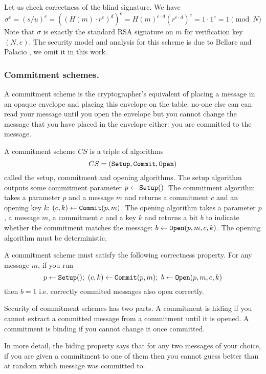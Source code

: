 \documentclass[envcountsame]{llncs}
\newcommand{\alg}[1]{\textup{\texttt{#1}}}
\begin{document}
Let us check correctness of the blind signature. We have
\[
\sigma^e = (s/u)^e = ((H(m) \cdot r^e)^d)^e = H(m)^{e \cdot d} (r^{e \cdot d})^e
= 1 \cdot 1^e = 1 \pmod{N}
\]
Note that $\sigma$ is exactly the standard RSA signature on $m$ for verification
key $(N, e)$. The security model and analysis for this scheme is due to Bellare
and Palacio \cite{BP??}, we omit it in this work.

\subsubsection{Commitment schemes.}
A commitment scheme is the cryptographer's equivalent of placing a message in an
opaque envelope and placing this envelope on the table: no-one else can can read
your message until you open the envelope but you cannot change the message that
you have placed in the envelope either: you are committed to the message.

\begin{definition}
A commitment scheme $CS$ is a triple of algorithms
\[
CS = \left( \alg{Setup}, \alg{Commit}, \alg{Open}\right)
\]
called the setup, commitment and opening algorithms. The setup algorithm outputs
some commitment parameter $p \gets \alg{Setup}()$. The commitment algorithm
takes a parameter $p$ and a message $m$ and returns a commitment $c$ and an
opening key $k$: $(c, k) \gets \alg{Commit}(p, m)$. The opening algorithm takes
a parameter $p$, a message $m$, a commitment $c$ and a key $k$ and returns a bit
$b$ to indicate whether the commitment matches the message: $b \gets
\alg{Open}(p, m, c, k)$. The opening algorithm must be deterministic.

A commitment scheme must satisfy the following correctness property. For any
message $m$, if you run
\[
p \gets \alg{Setup}();\ 
(c, k) \gets \alg{Commit}(p, m);\ b \gets \alg{Open}(p, m, c, k)
\]
then $b = 1$ i.e. correctly commited messages also open correctly.
\end{definition}

Security of commitment schemes has two parts. A commitment is hiding if you
cannot extract a committed message from a commitment until it is opened. A
commitment is binding if you cannot change it once committed.

In more detail, the hiding property says that for any two messages of your
choice, if you are given a commitment to one of them then you cannot guess
better than at random which message was committed to.
\end{document}
